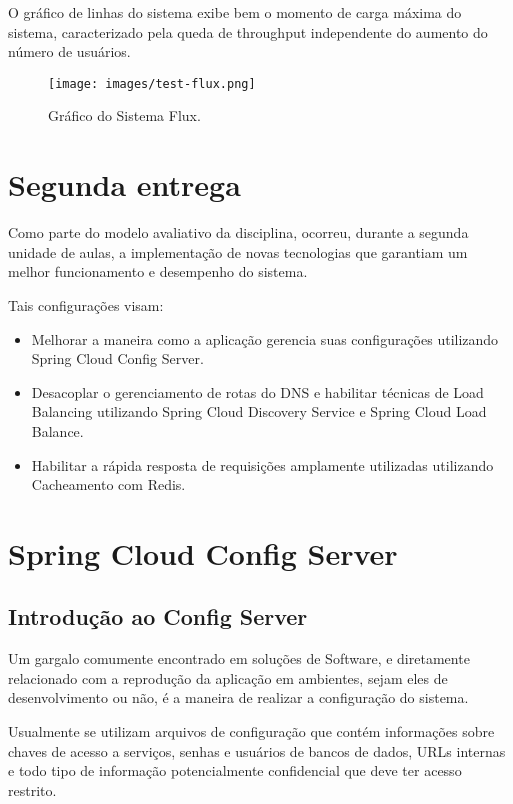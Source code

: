 \documentclass[12pt, openright, oneside, a4paper, article,
  section=TITLE
]{abntex2}
\begin{document}
O gráfico de linhas do sistema exibe bem o momento de carga máxima do sistema, caracterizado pela queda de throughput independente do aumento do número de usuários.

\begin{figure}[htb]
  \begin{center}
    \texttt{[image: images/test-flux.png]}
  \end{center}
  \caption{Gráfico do Sistema Flux.}
\end{figure}

\section{Segunda entrega}

Como parte do modelo avaliativo da disciplina, ocorreu, durante a segunda unidade de aulas, a implementação de novas tecnologias que garantiam um melhor funcionamento e desempenho do sistema. 

Tais configurações visam:

\begin{itemize}
  \item Melhorar a maneira como a aplicação gerencia suas configurações utilizando Spring Cloud Config Server. 
  \item Desacoplar o gerenciamento de rotas do DNS e habilitar técnicas de Load Balancing utilizando Spring Cloud Discovery Service e Spring Cloud Load Balance. 
  \item Habilitar a rápida resposta de requisições amplamente utilizadas utilizando Cacheamento com Redis. 
\end{itemize}

\section{Spring Cloud Config Server}

\subsection{Introdução ao Config Server}

Um gargalo comumente encontrado em soluções de Software, e diretamente relacionado com a reprodução da aplicação em ambientes, sejam eles de desenvolvimento ou não, é a maneira de realizar a configuração do sistema. 

Usualmente se utilizam arquivos de configuração que contém informações sobre chaves de acesso a serviços, senhas e usuários de bancos de dados, URLs internas e todo tipo de informação potencialmente confidencial que deve ter acesso restrito. 
\end{document}

